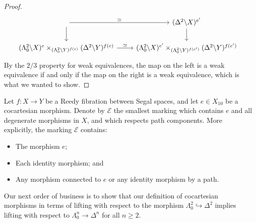 \documentclass[main.tex]{subfiles}
\begin{document}
\begin{proof}
\begin{equation*}
\begin{tikzcd}
      \arrow[r, "\simeq"]
      \arrow[d]
      & (\Delta^{2} \backslash X)^{e'}
      \arrow[d]
      \\
      (\Lambda^{2}_{0} \backslash X)^{e} \times_{(\Lambda^{2}_{0} \backslash Y)^{f(e)}} (\Delta^{2} \backslash Y)^{f(e)}
      \arrow[r, "\simeq"]
      & (\Lambda^{2}_{0} \backslash X)^{e'} \times_{(\Lambda^{2}_{0} \backslash Y)^{f(e')}} (\Delta^{2} \backslash Y)^{f(e')}
    \end{tikzcd}
  \end{equation*}
  By the $2/3$ property for weak equivalences, the map on the left is a weak equivalence if and only if the map on the right is a weak equivalence, which is what we wanted to show.
\end{proof}

\begin{definition}
  \label{def:morphism_generated_marking}
  Let $f\colon X \to Y$ be a Reedy fibration between Segal spaces, and let $e \in X_{10}$ be a cocartesian morphism. Denote by $\mathcal{E}$ the smallest marking which contains $e$ and all degenerate morphisms in $X$, and which respects path components. More explicitly, the marking $\mathcal{E}$ contains:
  \begin{itemize}
    \item The morphism $e$;

    \item Each identity morphism; and

    \item Any morphism connected to $e$ or any identity morphism by a path.
  \end{itemize}
\end{definition}

Our next order of business is to show that our definition of cocartesian morphisms in terms of lifting with respect to the morphism $\Lambda^{2}_{0} \hookrightarrow \Delta^{2}$ implies lifting with respect to $\Lambda^{n}_{0} \to \Delta^{n}$ for all $n \geq 2$.
\end{document}
